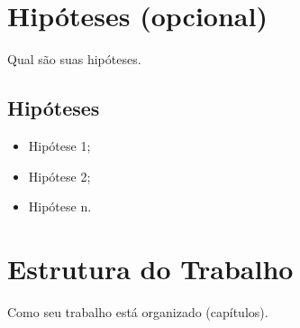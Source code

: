 \section{Hipóteses (opcional)}

Qual são suas hipóteses.

\subsection{Hipóteses}
\begin{itemize}
	\item Hipótese 1;
	\item Hipótese 2;
	\item Hipótese n.
\end{itemize}


\section{Estrutura do Trabalho}

Como seu trabalho está organizado (capítulos).